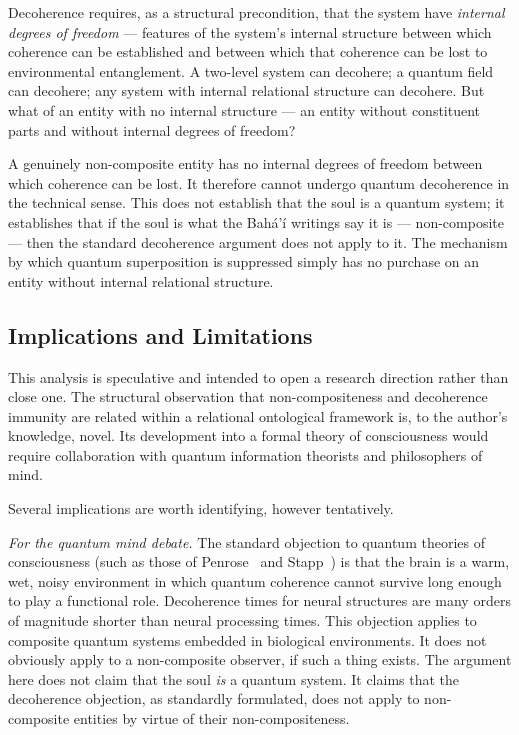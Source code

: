Decoherence requires, as a structural precondition, that the system have
\emph{internal degrees of freedom} --- features of the system's internal
structure between which coherence can be established and between which
that coherence can be lost to environmental entanglement.
A two-level system can decohere; a quantum field can decohere; any system
with internal relational structure can decohere.
But what of an entity with no internal structure --- an entity without
constituent parts and without internal degrees of freedom?

A genuinely non-composite entity has no internal degrees of freedom between
which coherence can be lost.
It therefore cannot undergo quantum decoherence in the technical sense.
This does not establish that the soul is a quantum system; it establishes that
if the soul is what the Bahá'í writings say it is --- non-composite --- then
the standard decoherence argument does not apply to it.
The mechanism by which quantum superposition is suppressed simply has
no purchase on an entity without internal relational structure.

\subsection{Implications and Limitations}

This analysis is speculative and intended to open a research direction
rather than close one.
The structural observation that non-compositeness and decoherence immunity
are related within a relational ontological framework is, to the author's
knowledge, novel.
Its development into a formal theory of consciousness would require
collaboration with quantum information theorists and philosophers of mind.

Several implications are worth identifying, however tentatively.

\emph{For the quantum mind debate.}
The standard objection to quantum theories of consciousness (such as those
of Penrose~\citeyearpar{Penrose1989} and Stapp~\citeyearpar{Stapp2007})
is that the brain is a warm, wet, noisy environment in which quantum
coherence cannot survive long enough to play a functional role.
Decoherence times for neural structures are many orders of magnitude
shorter than neural processing times.
This objection applies to composite quantum systems embedded in biological
environments.
It does not obviously apply to a non-composite observer, if such a thing
exists.
The argument here does not claim that the soul \emph{is} a quantum system.
It claims that the decoherence objection, as standardly formulated, does not
apply to non-composite entities by virtue of their non-compositeness.

